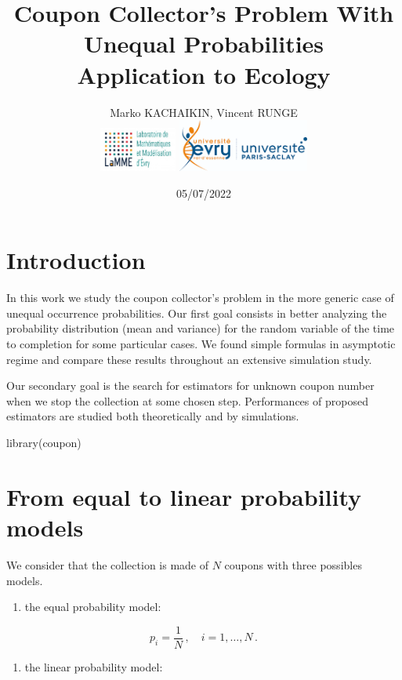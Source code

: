 \documentclass[
]{article}
\title{Coupon Collector's Problem With Unequal Probabilities\\
\textbf{Application to Ecology}}
\author{Marko KACHAIKIN, Vincent RUNGE\\
\includegraphics[width=1in,height=\textheight]{logo_lamme.png}
\includegraphics[width=1.7in,height=\textheight]{logo_UEVE.png}}
\date{05/07/2022}
\newenvironment{Shaded}{\begin{snugshade}}{\end{snugshade}}
\newcommand{\FunctionTok}[1]{\textcolor[rgb]{0.00,0.00,0.00}{#1}}
\newcommand{\NormalTok}[1]{#1}
\providecommand{\tightlist}{%
  \setlength{\itemsep}{0pt}\setlength{\parskip}{0pt}}
\begin{document}
\maketitle

{
\hypersetup{linkcolor=}
\setcounter{tocdepth}{2}
\tableofcontents
}
\noindent\hrulefill

\hypertarget{introduction}{%
\section{Introduction}\label{introduction}}

In this work we study the coupon collector's problem in the more generic
case of unequal occurrence probabilities. Our first goal consists in
better analyzing the probability distribution (mean and variance) for
the random variable of the time to completion for some particular cases.
We found simple formulas in asymptotic regime and compare these results
throughout an extensive simulation study.

Our secondary goal is the search for estimators for unknown coupon
number when we stop the collection at some chosen step. Performances of
proposed estimators are studied both theoretically and by simulations.

\begin{Shaded}
\begin{Highlighting}[]
\FunctionTok{library}\NormalTok{(coupon)}
\end{Highlighting}
\end{Shaded}

\hypertarget{from-equal-to-linear-probability-models}{%
\section{From equal to linear probability
models}\label{from-equal-to-linear-probability-models}}

We consider that the collection is made of \(N\) coupons with three
possibles models.

\begin{enumerate}
\def\labelenumi{\arabic{enumi}.}
\tightlist
\item
  the equal probability model:
\end{enumerate}

\[p_i = \frac{1}{N}\,,\quad i = 1,\ldots, N\,.\]

\begin{enumerate}
\def\labelenumi{\arabic{enumi}.}
\setcounter{enumi}{1}
\tightlist
\item
  the linear probability model:
\end{enumerate}
\end{document}
